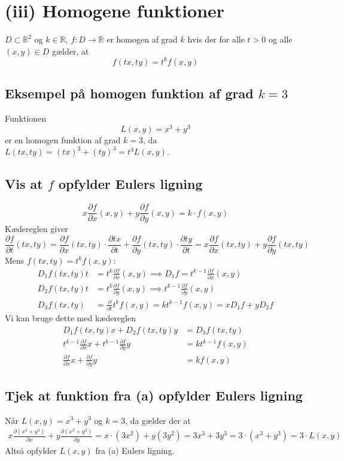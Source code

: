\documentclass{report}
\begin{document}
\newpage\section{(iii) Homogene funktioner}
$D\subset\mathbb{R}^2$ og $k\in\mathbb{R}$, $f:D\to\mathbb{R}$ er homogen af grad $k$ hvis der for alle $t>0$ og alle $(x,y)\in D$ gælder, at
\begin{equation}
    f(tx,ty)=t^kf(x,y)
\end{equation}
\subsection{Eksempel på homogen funktion af grad $k=3$}
Funktionen $$L(x,y)=x^3+y^3$$er en homogen funktion af grad $k=3$, da $L(tx,ty)=(tx)^3+(ty)^3=t^3L(x,y)$.
\subsection{Vis at $f$ opfylder Eulers ligning}
\begin{equation}
    x\frac{\partial f}{\partial x}(x,y)+y\frac{\partial f}{\partial y}(x,y)=k\cdot f(x,y)
\end{equation}
Kædereglen giver $$\frac{\partial f}{\partial t}(tx,ty)=\frac{\partial f}{\partial x}(tx,ty)\cdot\frac{\partial tx}{\partial t}+\frac{\partial f}{\partial y}(tx,ty)\cdot\frac{\partial ty}{\partial t}=x\frac{\partial f}{\partial x}(tx,ty)+y\frac{\partial f}{\partial y}(tx,ty)$$
Mens $f(tx,ty)=t^kf(x,y)$:
\begin{align*}
    D_1f(tx,ty)t&=t^k\frac{\partial f}{\partial x}(x,y)\implies D_1f=t^{k-1}\frac{\partial f}{\partial x}(x,y)\\
    D_2f(tx,ty)t&=t^k\frac{\partial f}{\partial y}(x,y)\implies t^{k-1}\frac{\partial f}{\partial y}(x,y)\\
    D_3f(tx,ty)&=\frac{\partial}{\partial t}t^kf(x,y)=kt^{k-1}f(x,y)=xD_1f+yD_2f
\end{align*}
Vi kan bruge dette med kædereglen
\begin{align*}
    D_1f(tx,ty)x+D_2f(tx,ty)y&=D_3f(tx,ty)\\
    t^{k-1}\frac{\partial f}{\partial x}x+t^{k-1}\frac{\partial f}{\partial y}y&=kt^{k-1}f(x,y)\\
    \frac{\partial f}{\partial x}x+\frac{\partial f}{\partial y}y&=kf(x,y)
\end{align*}
\subsection{Tjek at funktion fra (a) opfylder Eulers ligning}
Når $L(x,y)=x^3+y^3$ og $k=3$, da gælder der at
\begin{align*}
    x\frac{\partial (x^3+y^3)}{\partial x}+y\frac{\partial (x^3+y^3)}{\partial y}=x\cdot(3x^2)+y(3y^2)=3x^3+3y^3=3\cdot(x^3+y^3)=3\cdot L(x,y)
\end{align*}
Altså opfylder $L(x,y)$ fra (a) Eulers ligning.
\end{document}
